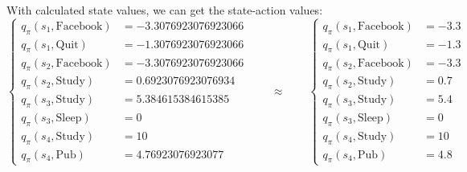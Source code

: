 \begin{homeworkProblem}
With calculated state values, we can get the state-action values:
$$\begin{cases}
q_{\pi}(s_1, \text{Facebook}) &= -3.3076923076923066 \\
q_{\pi}(s_1, \text{Quit}) &= -1.3076923076923066 \\
q_{\pi}(s_2, \text{Facebook}) &= -3.3076923076923066 \\
q_{\pi}(s_2, \text{Study}) &= 0.6923076923076934 \\
q_{\pi}(s_3, \text{Study}) &= 5.384615384615385 \\
q_{\pi}(s_3, \text{Sleep}) &= 0 \\
q_{\pi}(s_4, \text{Study}) &= 10 \\
q_{\pi}(s_4, \text{Pub}) &= 4.76923076923077
\end{cases} \qquad\approx\qquad \begin{cases}
q_{\pi}(s_1, \text{Facebook}) &= -3.3 \\
q_{\pi}(s_1, \text{Quit}) &= -1.3 \\
q_{\pi}(s_2, \text{Facebook}) &= -3.3 \\
q_{\pi}(s_2, \text{Study}) &= 0.7 \\
q_{\pi}(s_3, \text{Study}) &= 5.4 \\
q_{\pi}(s_3, \text{Sleep}) &= 0 \\
q_{\pi}(s_4, \text{Study}) &= 10 \\
q_{\pi}(s_4, \text{Pub}) &= 4.8
\end{cases}$$


\end{homeworkProblem}
